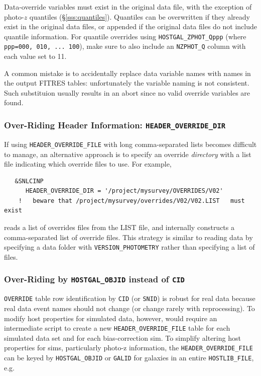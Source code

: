 \documentclass[12pt]{article}
\begin{document}
Data-override variables must exist in the original data file,
with the exception of photo-$z$ quantiles (\S\ref{sss:quantiles}).
Quantiles can be overwritten if they already exist in the
original data files, 
or appended if the original data files
do not include quantile information. For quantile overrides using
\verb|HOSTGAL_ZPHOT_Qppp| (where {\tt ppp=000, 010, ... 100}), 
make sure to also include an \verb|NZPHOT_Q| column with each value set to 11.


A common  mistake is to accidentally replace data variable names with names in the
output FITRES tables: unfortunately the variable naming is not consistent.
Such substituion usually results in an abort since no
valid override variables are found.


\clearpage %
\subsubsection{Over-Riding Header Information: {\tt HEADER\_OVERRIDE\_DIR} }
\label{sss:header_override_dir}
%
If using \verb|HEADER_OVERRIDE_FILE| with long comma-separated lists becomes
difficult to manage, an alternative approach is to specify an override
{\it directory} with a list file indicating which override files to use.
For example,
\begin{verbatim}
   &SNLCINP
      HEADER_OVERRIDE_DIR = '/project/mysurvey/OVERRIDES/V02'
    !   beware that /project/mysurvey/overrides/V02/V02.LIST   must exist
\end{verbatim}
reads a list of overrides files from the LIST file, and internally
constructs a comma-separated list of override files. This strategy
is similar to reading data by specifying a data folder with
\verb|VERSION_PHOTOMETRY| rather than specifying a list of files.


\subsubsection{Over-Riding by {\tt HOSTGAL\_OBJID} instead of {\tt CID}}
\label{sss:header_override_galid}

{\tt OVERRIDE} table row identification by {\tt CID} (or {\tt SNID}) is robust for real data
because real data event names should not change (or change rarely with reprocessing).
To modify host properties for simulated data, however, would require an intermediate
script to create a new {\tt HEADER\_OVERRIDE\_FILE} table for each simulated data
set and for each bias-correction sim. To simplify altering host properties for sims,
particularly photo-z information, the {\tt HEADER\_OVERRIDE\_FILE} can be keyed
by {\tt HOSTGAL\_OBJID} or {\tt GALID} for galaxies in an entire {\tt HOSTLIB\_FILE}, e.g. 
\end{document}
